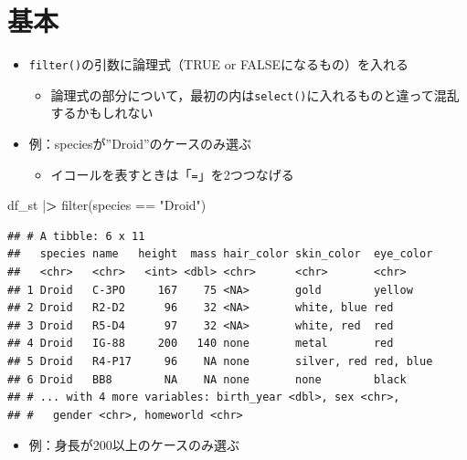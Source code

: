 \documentclass[
  xelatex,ja=standard, b5paper]{bxjsbook}
\newenvironment{Shaded}{\begin{snugshade}}{\end{snugshade}}
\newcommand{\ErrorTok}[1]{\textcolor[rgb]{0.64,0.00,0.00}{\textbf{#1}}}
\newcommand{\FunctionTok}[1]{\textcolor[rgb]{0.00,0.00,0.00}{#1}}
\newcommand{\NormalTok}[1]{#1}
\newcommand{\SpecialCharTok}[1]{\textcolor[rgb]{0.00,0.00,0.00}{#1}}
\newcommand{\StringTok}[1]{\textcolor[rgb]{0.31,0.60,0.02}{#1}}
\providecommand{\tightlist}{%
  \setlength{\itemsep}{0pt}\setlength{\parskip}{0pt}}
\begin{document}
\hypertarget{filter-st}{%
\section{基本}\label{filter-st}}

\begin{itemize}
\tightlist
\item
  \texttt{filter()}の引数に論理式（TRUE or FALSEになるもの）を入れる

  \begin{itemize}
  \tightlist
  \item
    論理式の部分について，最初の内は\texttt{select()}に入れるものと違って混乱するかもしれない
  \end{itemize}
\item
  例：speciesが''Droid''のケースのみ選ぶ

  \begin{itemize}
  \tightlist
  \item
    イコールを表すときは「\texttt{=}」を2つつなげる
  \end{itemize}
\end{itemize}

\begin{Shaded}
\begin{Highlighting}[]
\NormalTok{df\_st }\SpecialCharTok{|}\ErrorTok{\textgreater{}} 
  \FunctionTok{filter}\NormalTok{(species }\SpecialCharTok{==} \StringTok{"Droid"}\NormalTok{)}
\end{Highlighting}
\end{Shaded}

\begin{verbatim}
## # A tibble: 6 x 11
##   species name   height  mass hair_color skin_color  eye_color
##   <chr>   <chr>   <int> <dbl> <chr>      <chr>       <chr>    
## 1 Droid   C-3PO     167    75 <NA>       gold        yellow   
## 2 Droid   R2-D2      96    32 <NA>       white, blue red      
## 3 Droid   R5-D4      97    32 <NA>       white, red  red      
## 4 Droid   IG-88     200   140 none       metal       red      
## 5 Droid   R4-P17     96    NA none       silver, red red, blue
## 6 Droid   BB8        NA    NA none       none        black    
## # ... with 4 more variables: birth_year <dbl>, sex <chr>,
## #   gender <chr>, homeworld <chr>
\end{verbatim}

\begin{itemize}
\tightlist
\item
  例：身長が200以上のケースのみ選ぶ
\end{itemize}
\end{document}
